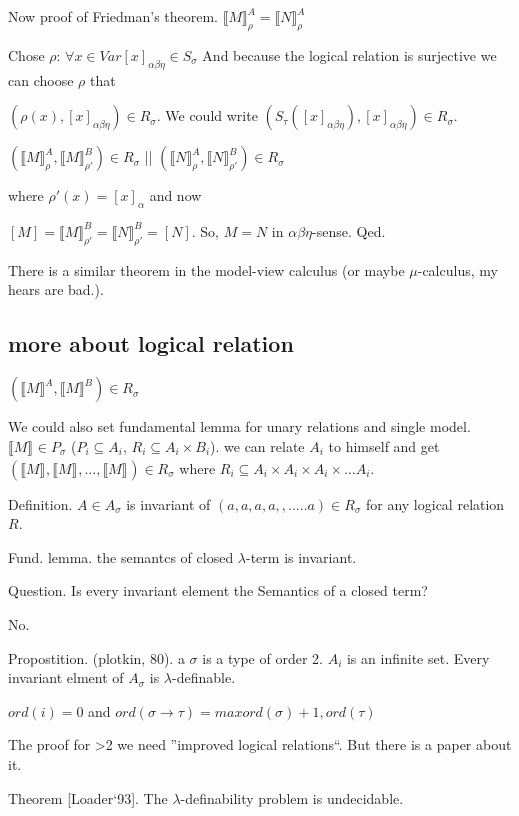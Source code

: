 \documentclass[a4paper,10pt]{book}
\newcommand{\sem}[2]{ \llbracket#1\rrbracket_{#2} }
\begin{document}
Now proof of Friedman's theorem.
$\sem{M}{\rho}^A = \sem{N}{\rho}^A$

Chose $\rho$: $\forall x \in Var      [x]_{\alpha\beta\eta} \in S_\sigma$
And because the logical relation is surjective  we can choose $\rho$ that

$(\rho(x), [x]_{\alpha\beta\eta}) \in R_\sigma$. We could write
$(S_\tau([x]_{\alpha\beta\eta}), [x]_{\alpha\beta\eta}) \in R_\sigma$.


$( \sem{M}{\rho}^A, \sem{M}{\rho'}^B ) \in R_\sigma$
     ||
$( \sem{N}{\rho}^A, \sem{N}{\rho'}^B ) \in R_\sigma$     

where $\rho'(x) = [x]_{\alpha}$ and now

$[M] = \sem{M}{\rho'}^B = \sem{N}{\rho'}^B = [N]$. So, $M=N$ in $\alpha\beta\eta$-sense. Qed.

There is a similar theorem in the model-view calculus (or maybe $\mu$-calculus, my hears are bad.).


\subsection{more about logical relation}

$(\sem{M}{}^A, \sem{M}{}^B) \in R_\sigma$

We could also set fundamental lemma for unary relations and single model.
$\sem{M}{} \in P_\sigma$ ($P_i \subseteq A_i$, $R_i \subseteq A_i \times B_i$). we can relate $A_i$ to himself
and get $(\sem{M}{}, \sem{M}{}, ..., \sem{M}{}) \in R_\sigma$ where $R_i \subseteq A_i \times A_i \times A_i \times ... A_i$.

Definition. $A\in A_\sigma$ is invariant of $(a,a,a,a,,.....a) \in R_\sigma$ for any logical relation $R$.

Fund. lemma. the semantcs of closed $\lambda$-term is invariant.

Question. Is every invariant element the Semantics of a closed term?   

No.

Propostition. (plotkin, 80). a $\sigma$ is a type of order 2. $A_i$ is an infinite set. Every invariant  
elment of $A_\sigma$ is $\lambda$-definable.

$ord(i) = 0$ and $ord(\sigma \rightarrow \tau) = max { ord(\sigma) + 1, ord(\tau)}$

The proof for >2 we need ''improved logical relations``. But there is a paper about it.

Theorem [Loader`93]. The $\lambda$-definability problem is undecidable.
\end{document}
